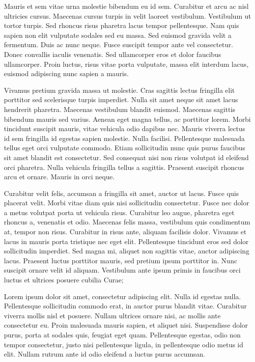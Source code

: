 \documentclass[12pt, a4paper]{article}
\begin{document}
Mauris et sem vitae urna molestie bibendum eu id sem. Curabitur et arcu ac nisl
ultricies cursus. Maecenas cursus turpis in velit laoreet vestibulum.
Vestibulum ut tortor turpis. Sed rhoncus risus pharetra lacus tempor
pellentesque. Nam quis sapien non elit vulputate sodales sed eu massa. Sed
euismod gravida velit a fermentum. Duis ac nunc neque. Fusce suscipit tempor
ante vel consectetur. Donec convallis iaculis venenatis. Sed ullamcorper eros
et dolor faucibus ullamcorper. Proin luctus, risus vitae porta vulputate, massa
elit interdum lacus, euismod adipiscing nunc sapien a mauris.

Vivamus pretium gravida massa ut molestie. Cras sagittis lectus fringilla elit
porttitor sed scelerisque turpis imperdiet. Nulla sit amet neque sit amet lacus
hendrerit pharetra. Maecenas vestibulum blandit euismod. Maecenas sagittis
bibendum mauris sed varius. Aenean eget magna tellus, ac porttitor lorem. Morbi
tincidunt suscipit mauris, vitae vehicula odio dapibus nec. Mauris viverra
lectus id sem fringilla id egestas sapien molestie. Nulla facilisi.
Pellentesque malesuada tellus eget orci vulputate commodo. Etiam sollicitudin
nunc quis purus faucibus sit amet blandit est consectetur. Sed consequat nisi
non risus volutpat id eleifend orci pharetra. Nulla vehicula fringilla tellus
a sagittis. Praesent suscipit rhoncus arcu et ornare. Mauris in orci neque.

Curabitur velit felis, accumsan a fringilla sit amet, auctor ut lacus. Fusce
quis placerat velit. Morbi vitae diam quis nisi sollicitudin consectetur. Fusce
nec dolor a metus volutpat porta ut vehicula risus. Curabitur leo augue,
pharetra eget rhoncus a, venenatis et odio. Maecenas felis massa, vestibulum
quis condimentum at, tempor non risus. Curabitur in risus ante, aliquam
facilisis dolor. Vivamus et lacus in mauris porta tristique nec eget elit.
Pellentesque tincidunt eros sed dolor sollicitudin imperdiet. Sed magna mi,
aliquet non sagittis vitae, auctor adipiscing lacus. Praesent luctus porttitor
mauris, sed pretium ipsum porttitor in. Nunc suscipit ornare velit id aliquam.
Vestibulum ante ipsum primis in faucibus orci luctus et ultrices posuere
cubilia Curae;

Lorem ipsum dolor sit amet, consectetur adipiscing elit. Nulla id egestas
nulla. Pellentesque sollicitudin commodo erat, in auctor purus blandit vitae.
Curabitur viverra mollis nisl et posuere. Nullam ultrices ornare nisi, ac
mollis ante consectetur eu. Proin malesuada mauris sapien, et aliquet nisi.
Suspendisse dolor purus, porta at sodales quis, feugiat eget quam. Pellentesque
egestas, odio non tempor consectetur, justo nisi pellentesque ligula, in
pellentesque odio metus id elit. Nullam rutrum ante id odio eleifend a luctus
purus accumsan.
\end{document}
